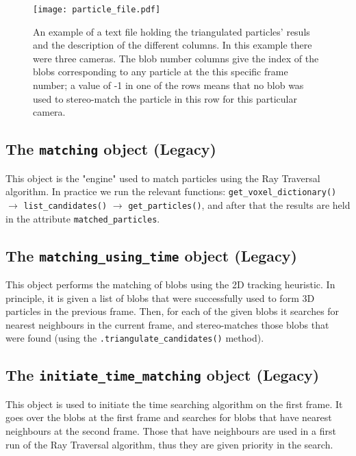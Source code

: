 \documentclass[10pt,a4paper]{article}
\begin{document}
\begin{figure}[!ht]
	\centering
	\texttt{[image: particle\_file.pdf]}
	\caption{An example of a text file holding the triangulated particles' resuls and the description of the different columns. In this example there were three cameras. The blob number columns give the index of the blobs corresponding to any particle at the this specific frame number; a value of -1 in one of the rows means that no blob was used to stereo-match the particle in this row for this particular camera. \label{fig:particlefile}} 
\end{figure}




\subsection{The \texttt{matching} object  (Legacy)}

This object is the "engine" used to match particles using the Ray Traversal algorithm. In practice we run the relevant functions: \texttt{get\_voxel\_dictionary()} $\rightarrow$ \texttt{list\_candidates()} $\rightarrow$ \texttt{get\_particles()}, and after that the results are held in the attribute \texttt{matched\_particles}.




\subsection{The \texttt{matching\_using\_time} object  (Legacy)}

This object performs the matching of blobs using the 2D tracking heuristic. In principle, it is given a list of blobs that were successfully used to form 3D particles in the previous frame. Then, for each of the given blobs it searches for nearest neighbours in the current frame, and stereo-matches those blobs that were found (using the \texttt{.triangulate\_candidates()} method). 





\subsection{The \texttt{initiate\_time\_matching} object  (Legacy)}

This object is used to initiate the time searching algorithm on the first frame. It goes over the blobs at the first frame and searches for blobs that have nearest neighbours at the second frame. Those that have neighbours are used in a first run of the Ray Traversal algorithm, thus they are given priority in the search.
\end{document}
